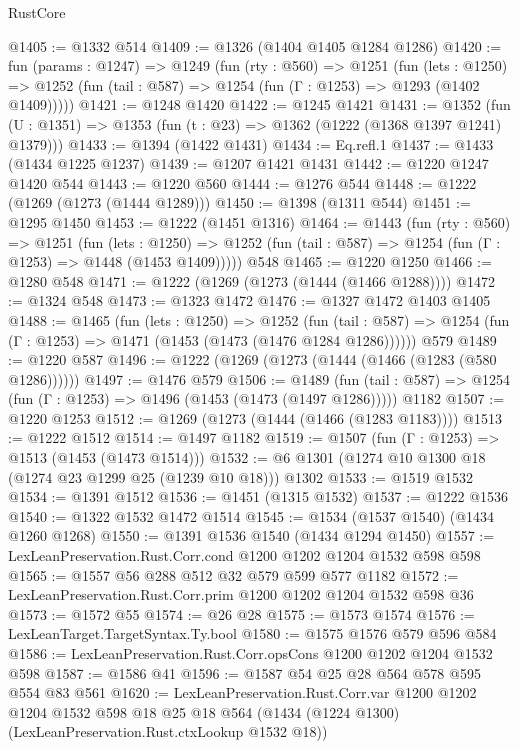 \begin{lexlean}{RustCore}
\begin{coremodule}
@1405 := @1332 @514
@1409 := @1326 (@1404 @1405 @1284 @1286)
@1420 := fun (params : @1247) =>
  @1249
    (fun (rty : @560) =>
    @1251
      (fun (lets : @1250) =>
      @1252 (fun (tail : @587) => @1254 (fun (Γ : @1253) => @1293 (@1402 @1409)))))
@1421 := @1248 @1420
@1422 := @1245 @1421
@1431 := @1352 (fun (U : @1351) => @1353 (fun (t : @23) => @1362 (@1222 (@1368 @1397 @1241) @1379)))
@1433 := @1394 (@1422 @1431)
@1434 := Eq.refl.{1}
@1437 := @1433 (@1434 @1225 @1237)
@1439 := @1207 @1421 @1431
@1442 := @1220 @1247 @1420 @544
@1443 := @1220 @560
@1444 := @1276 @544
@1448 := @1222 (@1269 (@1273 (@1444 @1289)))
@1450 := @1398 (@1311 @544)
@1451 := @1295 @1450
@1453 := @1222 (@1451 @1316)
@1464 := @1443
    (fun (rty : @560) =>
    @1251
      (fun (lets : @1250) =>
      @1252 (fun (tail : @587) => @1254 (fun (Γ : @1253) => @1448 (@1453 @1409)))))
    @548
@1465 := @1220 @1250
@1466 := @1280 @548
@1471 := @1222 (@1269 (@1273 (@1444 (@1466 @1288))))
@1472 := @1324 @548
@1473 := @1323 @1472
@1476 := @1327 @1472 @1403 @1405
@1488 := @1465
    (fun (lets : @1250) =>
    @1252
      (fun (tail : @587) => @1254 (fun (Γ : @1253) => @1471 (@1453 (@1473 (@1476 @1284 @1286))))))
    @579
@1489 := @1220 @587
@1496 := @1222 (@1269 (@1273 (@1444 (@1466 (@1283 (@580 @1286))))))
@1497 := @1476 @579
@1506 := @1489
    (fun (tail : @587) => @1254 (fun (Γ : @1253) => @1496 (@1453 (@1473 (@1497 @1286)))))
    @1182
@1507 := @1220 @1253
@1512 := @1269 (@1273 (@1444 (@1466 (@1283 @1183))))
@1513 := @1222 @1512
@1514 := @1497 @1182
@1519 := @1507 (fun (Γ : @1253) => @1513 (@1453 (@1473 @1514)))
@1532 := @6 @1301 (@1274 @10 @1300 @18 (@1274 @23 @1299 @25 (@1239 @10 @18))) @1302
@1533 := @1519 @1532
@1534 := @1391 @1512
@1536 := @1451 (@1315 @1532)
@1537 := @1222 @1536
@1540 := @1322 @1532 @1472 @1514
@1545 := @1534 (@1537 @1540) (@1434 @1260 @1268)
@1550 := @1391 @1536 @1540 (@1434 @1294 @1450)
@1557 := LexLeanPreservation.Rust.Corr.cond @1200 @1202 @1204 @1532 @598 @598
@1565 := @1557 @56 @288 @512 @32 @579 @599 @577 @1182
@1572 := LexLeanPreservation.Rust.Corr.prim @1200 @1202 @1204 @1532 @598 @36
@1573 := @1572 @55
@1574 := @26 @28
@1575 := @1573 @1574
@1576 := LexLeanTarget.TargetSyntax.Ty.bool
@1580 := @1575 @1576 @579 @596 @584
@1586 := LexLeanPreservation.Rust.Corr.opsCons @1200 @1202 @1204 @1532 @598
@1587 := @1586 @41
@1596 := @1587 @54 @25 @28 @564 @578 @595 @554 @83 @561
@1620 := LexLeanPreservation.Rust.Corr.var
    @1200
    @1202
    @1204
    @1532
    @598
    @18
    @25
    @18
    @564
    (@1434 (@1224 @1300) (LexLeanPreservation.Rust.ctxLookup @1532 @18))

\end{coremodule}
\end{lexlean}
